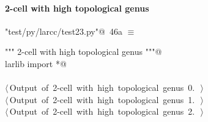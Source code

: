 \documentclass[11pt,oneside]{article}    %
\begin{document}
\paragraph{2-cell with high topological genus}

\begin{flushleft} \small \label{scrap74}
\protect{}\verb@"test/py/larcc/test23.py"@\nobreak\ {\footnotesize 46a }$\equiv$
\vspace{-1ex}
\begin{list}{}{} \item
\mbox{}\verb@""" 2-cell with high topological genus """@\\
\mbox{}\verb@from larlib import *@\\
\mbox{}\verb@@\\
\mbox{}\verb@@\hbox{$\langle\,$Output of 2-cell with high topological genus 0.\nobreak\ {\footnotesize {}}$\,\rangle$}\verb@@\\
\mbox{}\verb@@\hbox{$\langle\,$Output of 2-cell with high topological genus 1.\nobreak\ {\footnotesize {}}$\,\rangle$}\verb@@\\
\mbox{}\verb@@\hbox{$\langle\,$Output of 2-cell with high topological genus 2.\nobreak\ {\footnotesize {}}$\,\rangle$}\verb@@\\
\mbox{}\verb@@{\NWsep}
\end{list}
\vspace{-2ex}
\end{flushleft}
\end{document}
